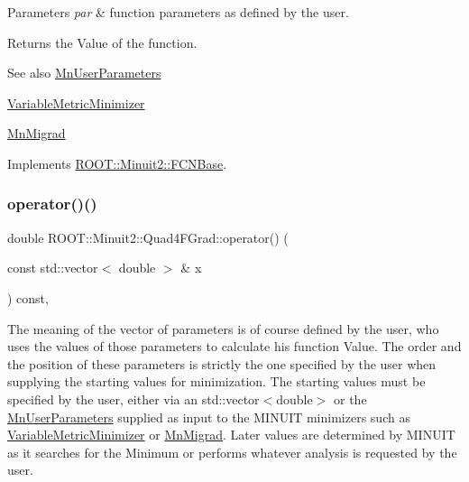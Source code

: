 \begin{DoxyParams}{Parameters}
{\em par} & function parameters as defined by the user.\\
\hline
\end{DoxyParams}
\begin{DoxyReturn}{Returns}
the Value of the function.
\end{DoxyReturn}
\begin{DoxySeeAlso}{See also}
\mbox{\hyperlink{classROOT_1_1Minuit2_1_1MnUserParameters}{Mn\+User\+Parameters}} 

\mbox{\hyperlink{classROOT_1_1Minuit2_1_1VariableMetricMinimizer}{Variable\+Metric\+Minimizer}} 

\mbox{\hyperlink{classROOT_1_1Minuit2_1_1MnMigrad}{Mn\+Migrad}} 
\end{DoxySeeAlso}


Implements \mbox{\hyperlink{classROOT_1_1Minuit2_1_1FCNBase_ae4a86bd94d0d0f5ca6fc8f8ab2bb43cd}{R\+O\+O\+T\+::\+Minuit2\+::\+F\+C\+N\+Base}}.

\mbox{\label{classROOT_1_1Minuit2_1_1Quad4FGrad_a8aaafaa9d7f974e27f5b54b30289dd6d}} 
\subsubsection{\texorpdfstring{operator()()}{operator()()}\hspace{0.1cm}{\footnotesize\ttfamily [2/2]}}
{\footnotesize\ttfamily double R\+O\+O\+T\+::\+Minuit2\+::\+Quad4\+F\+Grad\+::operator() (\begin{DoxyParamCaption}\item[{const std\+::vector$<$ double $>$ \&}]{x }\end{DoxyParamCaption}) const\hspace{0.3cm}{\ttfamily [inline]}, {\ttfamily [virtual]}}

The meaning of the vector of parameters is of course defined by the user, who uses the values of those parameters to calculate his function Value. The order and the position of these parameters is strictly the one specified by the user when supplying the starting values for minimization. The starting values must be specified by the user, either via an std\+::vector$<$double$>$ or the \mbox{\hyperlink{classROOT_1_1Minuit2_1_1MnUserParameters}{Mn\+User\+Parameters}} supplied as input to the M\+I\+N\+U\+IT minimizers such as \mbox{\hyperlink{classROOT_1_1Minuit2_1_1VariableMetricMinimizer}{Variable\+Metric\+Minimizer}} or \mbox{\hyperlink{classROOT_1_1Minuit2_1_1MnMigrad}{Mn\+Migrad}}. Later values are determined by M\+I\+N\+U\+IT as it searches for the Minimum or performs whatever analysis is requested by the user.


